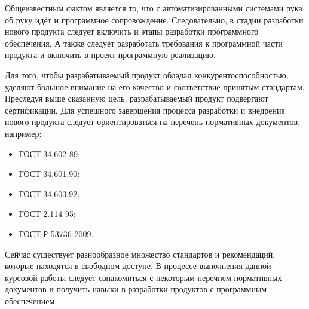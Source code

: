 Общеизвестным фактом является то, что с автоматизированными системами рука об руку идёт и программное сопровождение.
Следовательно, в стадии разработки нового продукта следует включить и этапы разработки программного обеспечения.
А также следует разработать требования к программной части продукта и включить в проект программную реализацию.

Для того, чтобы разрабатываемый продукт обладал конкурентоспособностью, уделяют большое внимание на его качество и соответствие принятым стандартам.
Преследуя выше сказанную цель, разрабатываемый продукт подвергают сертификации.
Для успешного завершения процесса разработки и внедрения нового продукта следует ориентироваться на перечень нормативных документов, например:
\begin{itemize}
	\item ГОСТ 34.602 89\cite{gost89};
	\item ГОСТ 34.601.90\cite{gost90}:
	\item ГОСТ 34.603.92\cite{gost92};
	\item ГОСТ 2.114-95\cite{gost95};
	\item ГОСТ Р 53736-2009\cite{gost09}.
\end{itemize}

Сейчас существует разнообразное множество стандартов и рекомендаций, которые находятся в свободном доступе.
В процессе выполнения данной курсовой работы следует ознакомиться с некоторым перечнем нормативных документов и получить 
навыки в разработки продуктов с программным обеспечением.
